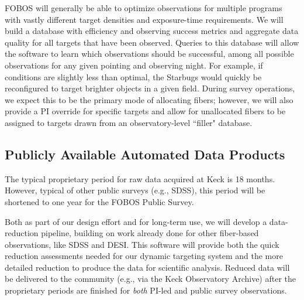 \documentclass[oneside,11pt]{amsart}
\newcommand{\comment}[2][todo]{{\color{#1}[[{\bf #2}]]}}
\newcounter{chalno}
\newcommand{\chal}[1]{\refstepcounter{chalno}\label{#1}}
\begin{document}
\medskip \chal{target}   FOBOS will generally be able to optimize observations for
multiple programs with vastly different target densities and
exposure-time requirements.  We will build a database with efficiency
and observing success metrics and aggregate data quality for all targets
that have been observed.  Queries to this database will allow the
software to learn which observations should be successful, among all
possible observations for any given pointing and observing night.  For
example, if conditions are slightly less than optimal, the Starbugs
would quickly be reconfigured to target brighter objects in a given
field.  During survey operations, we expect this to be the primary mode
of allocating fibers; however, we will also provide a PI override for
specific targets and allow for unallocated fibers to be assigned to
targets drawn from an observatory-level ``filler" database.



\subsection{Publicly Available Automated Data Products}
\label{sec:DAP}
\noindent \comment{1/2 page}

The typical proprietary period for raw data acquired at Keck is 18
months.  However, typical of other public surveys (e.g., SDSS), this
period will be shortened to one year for the FOBOS Public Survey.

Both as part of our design effort and for long-term use, we will develop
a data-reduction pipeline, building on work already done for other
fiber-based observations, like SDSS and DESI.  This software will
provide both the quick reduction assessments needed for our dynamic
targeting system and the more detailed reduction to produce the data for
scientific analysis.  Reduced data will be delivered to the community
(e.g., via the Keck Observatory Archive) after the proprietary periods
are finished for {\it both} PI-led and public survey observations.
\end{document}
